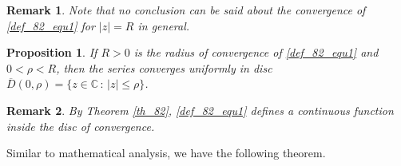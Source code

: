\documentclass[11pt]{book}
\newtheorem{proposition}{Proposition}[chapter]
\newtheorem{remark}{Remark}[chapter]
\theoremstyle{definition}
\numberwithin{equation}{chapter}
\begin{document}
\begin{remark}
Note that no conclusion can be said about the convergence of  \eqref{def_82_equ1} for $\left|z\right| = R$ in general.
\end{remark}

\medskip

\begin{proposition}
If $R > 0$ is the radius of convergence of \eqref{def_82_equ1} and $0 < \rho < R$, then the series converges uniformly in disc $\overline{D}(0,\rho) = \{z \in \mathbb{C} \,:\, \left|z\right| \leq \rho\}$. 
\end{proposition}

\begin{remark}
By Theorem \ref{th_82}, \eqref{def_82_equ1} defines a continuous function inside the disc of convergence. 
\end{remark}

\medskip

Similar to mathematical analysis, we have the following theorem.

\medskip
\end{document}
